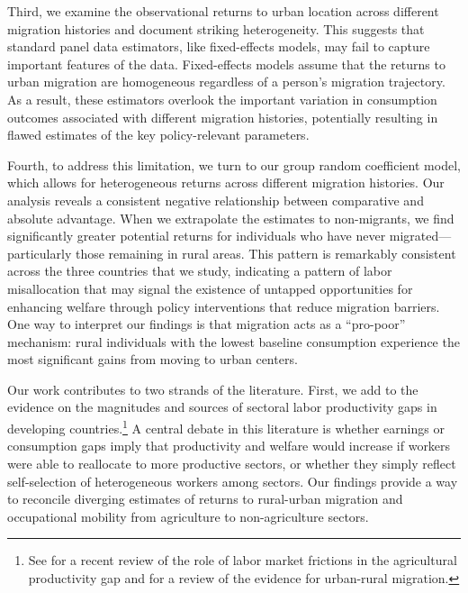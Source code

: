 \documentclass[12pt]{article}
\begin{document}
Third, we examine the observational returns to urban location across different migration histories and document striking heterogeneity. 
This suggests that standard panel data estimators, like fixed-effects models, may fail to capture important features of the data.
Fixed-effects models assume that the returns to urban migration are homogeneous regardless of a person's migration trajectory.
As a result, these estimators overlook the important variation in consumption outcomes associated with different migration histories, potentially resulting in flawed estimates of the key policy-relevant parameters. 

Fourth, to address this limitation, we turn to our group random coefficient model, which allows for heterogeneous returns across different migration histories. 
Our analysis reveals a consistent negative relationship between comparative and absolute advantage.
When we extrapolate the estimates to non-migrants, we find significantly greater potential returns for individuals who have never migrated---particularly those remaining in rural areas. 
This pattern is remarkably consistent across the three countries that we study, indicating a pattern of labor misallocation that may signal the existence of untapped opportunities for enhancing welfare through policy interventions that reduce migration barriers.
One way to interpret our findings is that migration acts as a ``pro-poor'' mechanism: rural individuals with the lowest baseline consumption experience the most significant gains from moving to urban centers. 


Our work contributes to two strands of the literature. 
First, we add to the evidence on the magnitudes and sources of sectoral labor productivity gaps in developing countries.\footnote{See \cite{donovanRoleLaborMarket2023} for a recent review of the role of labor market frictions in the agricultural productivity gap and \cite{lagakosUrbanRuralGapsDeveloping2020a} for a review of the evidence for urban-rural migration.}
A central debate in this literature is whether earnings or consumption gaps imply that productivity and welfare would increase if workers were able to reallocate to more productive sectors, or whether they simply reflect self-selection of heterogeneous workers among sectors.
Our findings provide a way to reconcile diverging estimates of returns to rural-urban migration and occupational mobility from agriculture to non-agriculture sectors.
\end{document}
